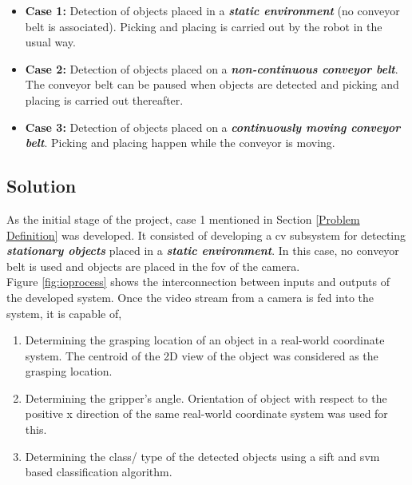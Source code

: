 \documentclass[a4paper,12pt]{report}
\begin{document}
\begin{itemize}
	\item \textbf{Case 1:} Detection of objects placed in a \textbf{\textit{static environment}} (no conveyor belt is associated). Picking and placing is carried out by the robot in the usual way.
	
	\item  \textbf{Case 2:} Detection of objects placed on a \textbf{\textit{non-continuous conveyor belt}}. The conveyor belt can be paused when objects are detected and picking and placing is carried out thereafter.
	
	\item \textbf{Case 3:} Detection of objects placed on a \textbf{\textit{continuously moving conveyor belt}}. Picking and placing happen while the conveyor is moving.
\end{itemize}



\subsection{Solution}
\label{cv_subsystem}
As the initial stage of the project, case 1 mentioned in Section \ref{Problem Definition} was developed. It consisted of developing a \ac{cv} subsystem for detecting \textbf{\textit{stationary objects}} placed in a \textbf{\textit{static environment}}. In this case, no conveyor belt is used and objects are placed in the \ac{fov} of the camera.\\

Figure \ref{fig:ioprocess} shows the interconnection between inputs and outputs of the developed system. Once the video stream from a camera is fed into the system, it is capable of,



\begin{enumerate}
	\item Determining the grasping location of an object in a real-world coordinate system. The centroid of the 2D view of the object was considered as the grasping location. 
	
	\item Determining the gripper's angle. Orientation of object with respect to the positive x direction of the same real-world coordinate system was used for this.
	
	\item  Determining the class/ type of the detected objects using a \ac{sift} and \ac{svm} based classification algorithm.
\end{enumerate}
\end{document}
